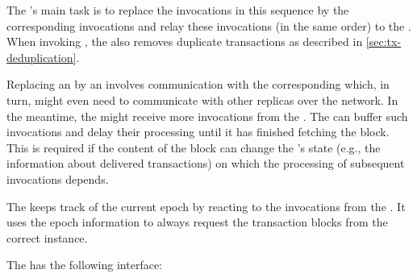 \documentclass{article}
\begin{document}
The 's main task is to replace the  invocations in this sequence by the corresponding  invocations
and relay these invocations (in the same order) to the .
When invoking , the  also removes duplicate transactions as described in \cref{sec:tx-deduplication}.

Replacing an  by an  involves communication with the corresponding 
which, in turn, might even need to communicate with other replicas over the network.
In the meantime, the  might receive more invocations from the .
The  can buffer such invocations and delay their processing until it has finished fetching the block.
This is required if the content of the block can change the 's state (e.g., the information about delivered transactions)
on which the processing of subsequent invocations depends.

The  keeps track of the current epoch by reacting to the  invocations from the .
It uses the epoch information to always request the transaction blocks from the correct  instance.

The  has the following interface:
\end{document}

